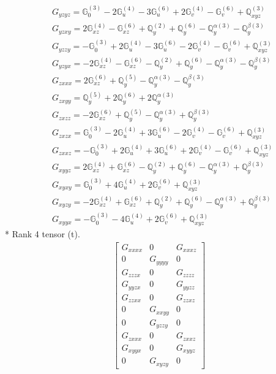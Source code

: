 \documentclass[fleqn,8pt,landscape]{jsarticle}
\begin{document}
\begin{align*}
& G_{yzyz} = \mathbb{G}_{0}^{(3)} - 2 \mathbb{G}_{u}^{(4)} - 3 \mathbb{G}_{u}^{(6)} + 2 \mathbb{G}_{v}^{(4)} - \mathbb{G}_{v}^{(6)} + \mathbb{Q}_{xyz}^{(3)} \\
& G_{yzxy} = 2 \mathbb{G}_{xz}^{(4)} - \mathbb{G}_{xz}^{(6)} + \mathbb{Q}_{y}^{(2)} + \mathbb{Q}_{y}^{(6)} - \mathbb{Q}_{y}^{\alpha(3)} - \mathbb{Q}_{y}^{\beta(3)} \\
& G_{yzzy} = - \mathbb{G}_{0}^{(3)} + 2 \mathbb{G}_{u}^{(4)} - 3 \mathbb{G}_{u}^{(6)} - 2 \mathbb{G}_{v}^{(4)} - \mathbb{G}_{v}^{(6)} + \mathbb{Q}_{xyz}^{(3)} \\
& G_{yzyx} = - 2 \mathbb{G}_{xz}^{(4)} - \mathbb{G}_{xz}^{(6)} - \mathbb{Q}_{y}^{(2)} + \mathbb{Q}_{y}^{(6)} - \mathbb{Q}_{y}^{\alpha(3)} - \mathbb{Q}_{y}^{\beta(3)} \\
& G_{zxxx} = 2 \mathbb{G}_{xz}^{(6)} + \mathbb{Q}_{y}^{(5)} - \mathbb{Q}_{y}^{\alpha(3)} - \mathbb{Q}_{y}^{\beta(3)} \\
& G_{zxyy} = \mathbb{Q}_{y}^{(5)} + 2 \mathbb{Q}_{y}^{(6)} + 2 \mathbb{Q}_{y}^{\alpha(3)} \\
& G_{zxzz} = - 2 \mathbb{G}_{xz}^{(6)} + \mathbb{Q}_{y}^{(5)} - \mathbb{Q}_{y}^{\alpha(3)} + \mathbb{Q}_{y}^{\beta(3)} \\
& G_{zxzx} = \mathbb{G}_{0}^{(3)} - 2 \mathbb{G}_{u}^{(4)} + 3 \mathbb{G}_{u}^{(6)} - 2 \mathbb{G}_{v}^{(4)} - \mathbb{G}_{v}^{(6)} + \mathbb{Q}_{xyz}^{(3)} \\
& G_{zxxz} = - \mathbb{G}_{0}^{(3)} + 2 \mathbb{G}_{u}^{(4)} + 3 \mathbb{G}_{u}^{(6)} + 2 \mathbb{G}_{v}^{(4)} - \mathbb{G}_{v}^{(6)} + \mathbb{Q}_{xyz}^{(3)} \\
& G_{xyyz} = 2 \mathbb{G}_{xz}^{(4)} + \mathbb{G}_{xz}^{(6)} - \mathbb{Q}_{y}^{(2)} + \mathbb{Q}_{y}^{(6)} - \mathbb{Q}_{y}^{\alpha(3)} + \mathbb{Q}_{y}^{\beta(3)} \\
& G_{xyxy} = \mathbb{G}_{0}^{(3)} + 4 \mathbb{G}_{u}^{(4)} + 2 \mathbb{G}_{v}^{(6)} + \mathbb{Q}_{xyz}^{(3)} \\
& G_{xyzy} = - 2 \mathbb{G}_{xz}^{(4)} + \mathbb{G}_{xz}^{(6)} + \mathbb{Q}_{y}^{(2)} + \mathbb{Q}_{y}^{(6)} - \mathbb{Q}_{y}^{\alpha(3)} + \mathbb{Q}_{y}^{\beta(3)} \\
& G_{xyyx} = - \mathbb{G}_{0}^{(3)} - 4 \mathbb{G}_{u}^{(4)} + 2 \mathbb{G}_{v}^{(6)} + \mathbb{Q}_{xyz}^{(3)}
\end{align*}
* Rank 4 tensor (t).
\begin{align*}
\begin{bmatrix} G_{xxxx} & 0 & G_{xxxz} \\ 0 & G_{yyyy} & 0 \\ G_{zzzx} & 0 & G_{zzzz} \\ G_{yyzx} & 0 & G_{yyzz} \\ G_{zzxx} & 0 & G_{zzxz} \\ 0 & G_{xxyy} & 0 \\ 0 & G_{yzzy} & 0 \\ G_{zxxx} & 0 & G_{zxxz} \\ G_{xyyx} & 0 & G_{xyyz} \\ 0 & G_{xyzy} & 0 \end{bmatrix}
\end{align*}
\end{document}
